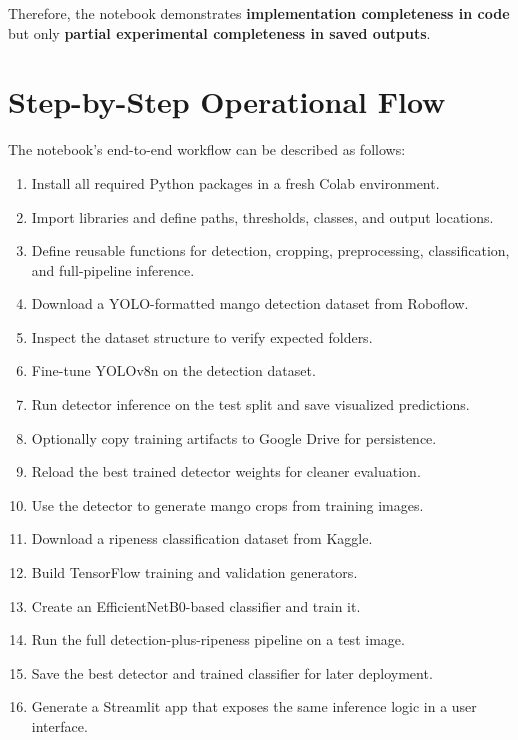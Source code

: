 \documentclass[12pt,a4paper]{article}
\begin{document}
Therefore, the notebook demonstrates \textbf{implementation completeness in code} but only \textbf{partial experimental completeness in saved outputs}.

\section{Step-by-Step Operational Flow}
The notebook's end-to-end workflow can be described as follows:
\begin{enumerate}
    \item Install all required Python packages in a fresh Colab environment.
    \item Import libraries and define paths, thresholds, classes, and output locations.
    \item Define reusable functions for detection, cropping, preprocessing, classification, and full-pipeline inference.
    \item Download a YOLO-formatted mango detection dataset from Roboflow.
    \item Inspect the dataset structure to verify expected folders.
    \item Fine-tune YOLOv8n on the detection dataset.
    \item Run detector inference on the test split and save visualized predictions.
    \item Optionally copy training artifacts to Google Drive for persistence.
    \item Reload the best trained detector weights for cleaner evaluation.
    \item Use the detector to generate mango crops from training images.
    \item Download a ripeness classification dataset from Kaggle.
    \item Build TensorFlow training and validation generators.
    \item Create an EfficientNetB0-based classifier and train it.
    \item Run the full detection-plus-ripeness pipeline on a test image.
    \item Save the best detector and trained classifier for later deployment.
    \item Generate a Streamlit app that exposes the same inference logic in a user interface.
\end{enumerate}
\end{document}
